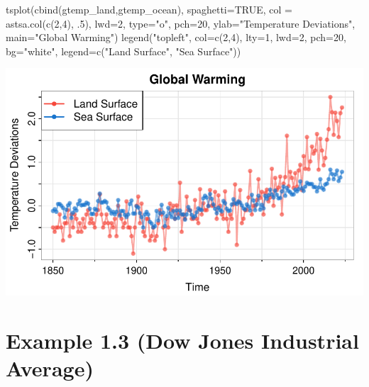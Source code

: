 \documentclass[
  letterpaper,
  DIV=11,
  numbers=noendperiod]{scrreprt}
\newenvironment{Shaded}{\begin{snugshade}}{\end{snugshade}}
\newcommand{\AttributeTok}[1]{\textcolor[rgb]{0.40,0.45,0.13}{#1}}
\newcommand{\ConstantTok}[1]{\textcolor[rgb]{0.56,0.35,0.01}{#1}}
\newcommand{\DecValTok}[1]{\textcolor[rgb]{0.68,0.00,0.00}{#1}}
\newcommand{\FunctionTok}[1]{\textcolor[rgb]{0.28,0.35,0.67}{#1}}
\newcommand{\NormalTok}[1]{\textcolor[rgb]{0.00,0.23,0.31}{#1}}
\newcommand{\StringTok}[1]{\textcolor[rgb]{0.13,0.47,0.30}{#1}}
\begin{document}
\begin{Shaded}
\begin{Highlighting}[]
\FunctionTok{tsplot}\NormalTok{(}\FunctionTok{cbind}\NormalTok{(gtemp\_land,gtemp\_ocean), }\AttributeTok{spaghetti=}\ConstantTok{TRUE}\NormalTok{, }\AttributeTok{col =} \FunctionTok{astsa.col}\NormalTok{(}\FunctionTok{c}\NormalTok{(}\DecValTok{2}\NormalTok{,}\DecValTok{4}\NormalTok{), .}\DecValTok{5}\NormalTok{), }
        \AttributeTok{lwd=}\DecValTok{2}\NormalTok{, }\AttributeTok{type=}\StringTok{"o"}\NormalTok{, }\AttributeTok{pch=}\DecValTok{20}\NormalTok{, }\AttributeTok{ylab=}\StringTok{"Temperature Deviations"}\NormalTok{, }\AttributeTok{main=}\StringTok{"Global Warming"}\NormalTok{)}
\FunctionTok{legend}\NormalTok{(}\StringTok{"topleft"}\NormalTok{, }\AttributeTok{col=}\FunctionTok{c}\NormalTok{(}\DecValTok{2}\NormalTok{,}\DecValTok{4}\NormalTok{), }\AttributeTok{lty=}\DecValTok{1}\NormalTok{, }\AttributeTok{lwd=}\DecValTok{2}\NormalTok{, }\AttributeTok{pch=}\DecValTok{20}\NormalTok{,  }\AttributeTok{bg=}\StringTok{"white"}\NormalTok{,}
        \AttributeTok{legend=}\FunctionTok{c}\NormalTok{(}\StringTok{"Land Surface"}\NormalTok{, }\StringTok{"Sea Surface"}\NormalTok{))}
\end{Highlighting}
\end{Shaded}

\includegraphics{LectureNotes/Lecture1_files/figure-pdf/ex-1-2-1.pdf}

\section{\texorpdfstring{{Example 1.3 (Dow Jones Industrial
Average)}}{Example 1.3 (Dow Jones Industrial Average)}}\label{example-1.3-dow-jones-industrial-average}
\end{document}
